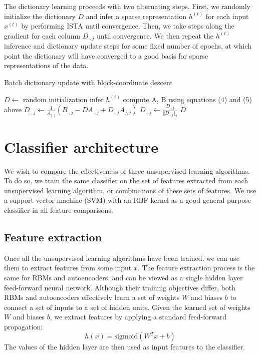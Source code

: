 \documentclass{article} %
\begin{document}
The dictionary learning proceeds with two alternating steps. First, we randomly initialize the dictionary $D$ and infer a sparse representation $h^{(t)}$ for each input $x^{(t)}$ by performing ISTA until convergence. Then, we take steps along the gradient for each column $D_{.,j}$ until convergence. We then repeat the $h^{(t)}$ inference and dictionary update steps for some fixed number of epochs, at which point the dictionary will have converged to a good basis for sparse representations of the data.


\begin{algorithm}
\caption{Batch dictionary update with block-coordinate descent}
\begin{algorithmic}[1]
\State $D\gets$ random initialization
		\State infer $h^{(t)}$ 
	\EndFor
	\State compute A, B using equations (4) and (5) above
			\State $D_{.,j}\gets \frac{1}{A_{j,j}} (B_{.,j} - D A_{.,j} + D_{.,j} A_{j,j})$
			\State $D_{.,j}\gets \frac{D_{.,j}}{\Vert D_{.,j} \Vert_2}$ 
		\EndFor
	\EndWhile
\EndWhile
\State\Return $D$
\end{algorithmic}
\end{algorithm}

\section{Classifier architecture}
We wish to compare the effectiveness of three unsupervised learning algorithms. To do so, we train the same classifier on the set of features extracted from each unsupervised learning algorithm, or combinations of these sets of features. We use a support vector machine (SVM) with an RBF kernel as a good general-purpose classifier in all feature comparisons.

\subsection{Feature extraction}
Once all the unsupervised learning algorithms have been trained, we can use them to extract features from some input $x$. The feature extraction process is the same for RBMs and autoencoders, and can be viewed as a single hidden layer feed-forward neural network. Although their training objectives differ, both RBMs and autoencoders effectively learn a set of weights $W$ and biases $b$ to connect a set of inputs to a set of hidden units. Given the learned set of weights $W$ and biases $b$, we extract features by applying a standard feed-forward propagation:
\begin{equation}
h(x) = \text{sigmoid}(W^T x + b)
\end{equation}
The values of the hidden layer are then used as input features to the classifier.
\end{document}
